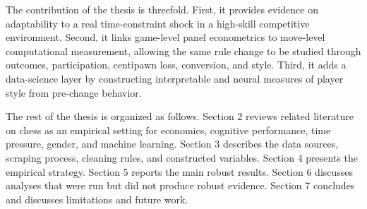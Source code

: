 The contribution of the thesis is threefold. First, it provides evidence on adaptability to a real time-constraint shock in a high-skill competitive environment. Second, it links game-level panel econometrics to move-level computational measurement, allowing the same rule change to be studied through outcomes, participation, centipawn loss, conversion, and style. Third, it adds a data-science layer by constructing interpretable and neural measures of player style from pre-change behavior.

The rest of the thesis is organized as follows. Section 2 reviews related literature on chess as an empirical setting for economics, cognitive performance, time pressure, gender, and machine learning. Section 3 describes the data sources, scraping process, cleaning rules, and constructed variables. Section 4 presents the empirical strategy. Section 5 reports the main robust results. Section 6 discusses analyses that were run but did not produce robust evidence. Section 7 concludes and discusses limitations and future work.
